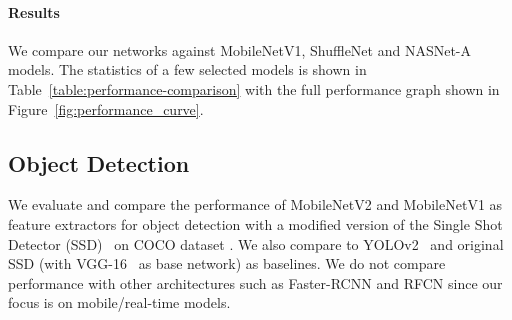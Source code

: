 \documentclass[10pt,twocolumn,letterpaper]{article}
\begin{document}
\paragraph{Results}
We compare our networks against \mbox{MobileNetV1}, \mbox{ShuffleNet} and \mbox{NASNet-A} models.
The statistics of a few selected models is shown in Table~\ref{table:performance-comparison} with the full performance graph shown in  Figure~\ref{fig:performance_curve}.
 
\begin{table}[b]
    \centering 
    \caption{
        Performance on \mbox{ImageNet}, comparison for different networks.
        As is common practice for ops, we count the total number of Multiply-Adds.
        In the last column we report running time in milliseconds (ms) for a single large core of the Google \mbox{Pixel 1} phone (using \mbox{TF-Lite}).
        We do not report \mbox{ShuffleNet} numbers as  efficient group convolutions and shuffling are not yet supported.
    }
    \label{table:performance-comparison}
\end{table}

\subsection{Object Detection}
We evaluate and compare the performance of \mbox{MobileNetV2} and \mbox{MobileNetV1} as feature extractors \cite{huang2016speed} for object detection with a modified version of the Single Shot Detector (SSD)~\cite{liu2016ssd} on \mbox{COCO} dataset \cite{COCO}.
We also compare to \mbox{YOLOv2}~\cite{redmon2016yolo9000} and original SSD (with VGG-16~\cite{VGGNet} as base network) as baselines.
We do not compare performance with other architectures such as \mbox{Faster-RCNN} \cite{ren2015faster} and RFCN \cite{dai2016rfcn} since our focus is on mobile/real-time models.
\end{document}
